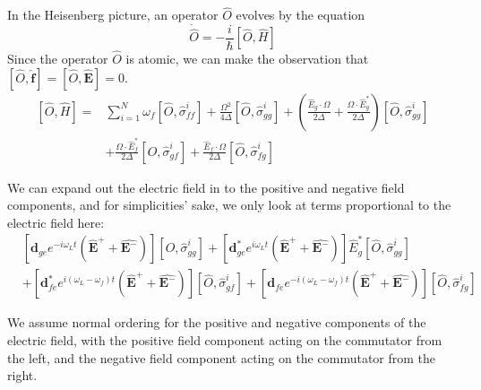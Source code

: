 \documentclass[a4paper, 11pt]{article}
\numberwithin{equation}{section}
\begin{document}
In the Heisenberg picture, an operator $\hat{O}$ evolves by the equation
\begin{equation}\dot{\hat{O}} = -\frac{i}{\hbar} [\hat{O}, \hat{H}]\end{equation}
Since the operator $\hat{O}$ is atomic, we can make the observation that $[\hat{O},
\hat{\mathbf{f}}] = [\hat{O}, \hat{\mathbf{E}}] = 0$.
\begin{equation}
\begin{aligned}
  [\hat{O}, \hat{H}] = &\sum_{i=1}^N \omega_f [\hat{O}, \hat{\sigma}_{ff}^i] +
  \frac{\Omega^2}{4\Delta}[\hat{O}, \hat{\sigma}_{gg}^i] + \left( \frac{\hat{E}_g \cdot \Omega}{2\Delta} + \frac{\Omega \cdot
  \hat{E}_g^*}{2\Delta} \right)[\hat{O}, \hat{\sigma}_{gg}^i]\\ &+ \frac{\Omega \cdot
  \hat{E}_f^*}{2\Delta} [\hat{O}, \hat{\sigma}_{gf}^i]+
  \frac{\hat{E}_f \cdot \Omega}{2\Delta}
  [\hat{O}, \hat{\sigma}_{fg}^i]
\end{aligned}
\end{equation}

We can expand out the electric field in to the positive and negative field components,
and for simplicities' sake, we only look at terms proportional to the electric field
here:
\begin{align*}
  &[\mathbf{d}_{ge}e^{-i\omega_Lt}
  (\hat{\mathbf{E}}^++\hat{\mathbf{E}^-})][\hat{O}, \hat{\sigma}_{gg}^i] +
  [\mathbf{d}_{ge}^*e^{i\omega_Lt}
  (\hat{\mathbf{E}}^++\hat{\mathbf{E}^-})]
  \hat{E}_g^*[\hat{O}, \hat{\sigma}_{gg}^i]\\&+
  [\mathbf{d}_{fe}^*e^{i(\omega_L-\omega_f)t}
  (\hat{\mathbf{E}}^++\hat{\mathbf{E}^-})][\hat{O}, \hat{\sigma}_{gf}^i]+
  [\mathbf{d}_{fe}e^{-i(\omega_L-\omega_f)t}
  (\hat{\mathbf{E}}^++\hat{\mathbf{E}^-})][\hat{O}, \hat{\sigma}_{fg}^i]
\end{align*}

We assume normal ordering for the positive and negative components of the electric
field, with the positive field component acting on the commutator from the left, and the
negative field component acting on the commutator from the right.
\end{document}
